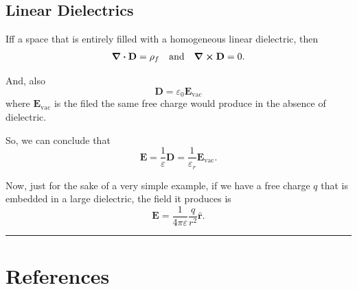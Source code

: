 \documentclass[a4paper]{article}
\numberwithin{equation}{subsection}
\let\oldhat\hat
\renewcommand{\vec}[1]{\mathbf{#1}}
\renewcommand{\hat}[1]{\oldhat{\mathbf{#1}}}
\begin{document}
\subsection{Linear Dielectrics}
Iff a space that is entirely filled with a homogeneous linear dielectric, then 
\begin{align*}
    \div \vec{D} = \rho_f &&\text{and}&& \curl \vec{D} =0.
\end{align*}

And, also
\[
    \vec{D} = \varepsilon_0 \vec{E}_{\text{vac}}
\]
where $\vec{E}_{\text{vac}}$ is the filed the same free charge would produce in the absence of dielectric.

So, we can conclude that
\begin{equation}
    \vec{E} = \frac{1}{\varepsilon} \vec{D} = \frac{1}{\varepsilon_r}\vec{E}_{\text{vac}}.
\end{equation}

Now, just for the sake of a very simple example, if we have a free charge $q$ that is embedded in a large dielectric, the field it produces is 
\begin{equation}
    \vec{E} = \frac{1}{4 \pi \varepsilon} \frac{q}{r^2} \hat{r}.
\end{equation}
\par\noindent\rule{\textwidth}{0.4pt}
\newpage
\section*{References}
%
\printbibliography
[heading = none]

\end{document}
